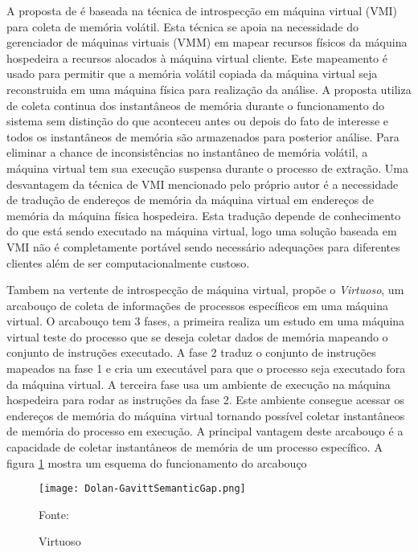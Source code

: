 A proposta de \cite{PoiselVMI:2013} é baseada na técnica de introspecção em máquina virtual (VMI) para coleta de memória volátil. 
%
Esta técnica se apoia na necessidade do gerenciador de máquinas virtuais (VMM) em mapear recursos físicos da máquina hospedeira a recursos alocados à máquina virtual cliente.
%
Este mapeamento é usado para permitir que a memória volátil copiada da máquina virtual seja reconstruida em uma máquina física para realização da análise.
%
A proposta utiliza de coleta continua dos instantâneos de memória durante o funcionamento do sistema sem distinção do que aconteceu antes ou depois do fato de interesse e todos os instantâneos de memória são armazenados para posterior análise.
%
Para eliminar a chance de inconsistências no instantâneo de memória volátil, a máquina virtual tem sua execução suspensa durante o processo de extração.
%
Uma desvantagem da técnica de VMI mencionado pelo próprio autor é a necessidade de tradução de endereços de memória da máquina virtual em endereços de memória da máquina física hospedeira.
%
Esta tradução depende de conhecimento do que está sendo executado na máquina virtual, logo uma solução baseada em VMI não é completamente portável sendo necessário adequações para diferentes clientes além de ser computacionalmente custoso.
%

Tambem na vertente de introspecção de máquina virtual, \cite{Dolan-GavittSemanticGap:2011} propõe o \textit{Virtuoso}, um arcabouço de coleta de informações de processos específicos em uma máquina virtual.
%
O arcabouço tem 3 fases, a primeira realiza um estudo em uma máquina virtual teste do processo que se deseja coletar dados de memória mapeando o conjunto de instruções executado. 
%
A fase 2 traduz o conjunto de instruções mapeados na fase 1 e cria um executável para que o processo seja executado fora da máquina virtual.
%
A terceira fase usa um ambiente de execução na máquina hospedeira para rodar as instruções da fase 2. Este ambiente consegue acessar os endereços de memória do máquina virtual tornando possível coletar instantâneos de memória do processo em execução.
%
A principal vantagem deste arcabouço é a capacidade de coletar instantâneos de memória de um processo específico.
%
A figura \ref{fig:Dolan-GavittSemanticGap} mostra um esquema do funcionamento do arcabouço

\begin{figure}[htb!]
\footnotesize
\caption{Virtuoso}
\texttt{[image: Dolan-GavittSemanticGap.png]}
\centering
\label{fig:Dolan-GavittSemanticGap}
\begin{center}
Fonte: \cite{Dolan-GavittSemanticGap:2011} 
\end{center}
\end{figure}


